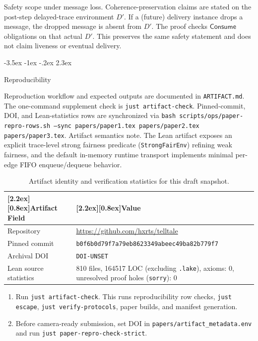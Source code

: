\documentclass[a4paper,10pt,twocolumn,english]{article}
\makeatletter
\renewcommand{\section}{\@startsection{section}{1}{\z@}%
  {-3.5ex \@plus -1ex \@minus -.2ex}%
  {2.3ex}%
  {\raggedright\normalfont\large\bfseries}}
\numberwithin{equation}{section}
\theoremstyle{paperdef}
\theoremstyle{paperplain}
\theoremstyle{paperdef}
\theoremstyle{paperremark}
\newcommand{\thead}[1]{\textbf{\raisebox{0pt}[2.2ex][0.8ex]{#1}}}
\newcommand{\Consume}{\ensuremath{\mathsf{Consume}}}
\makeatother
\begin{document}
Safety scope under message loss. Coherence-preservation claims are stated on the
post-step delayed-trace environment $D'$. If a (future) delivery instance drops a message,
the dropped message is absent from $D'$. The proof checks \Consume obligations on
that actual $D'$. This preserves the same safety statement and does not claim
liveness or eventual delivery.

\section{Reproducibility}
\label{app:reproducibility}

Reproduction workflow and expected outputs are documented in
\texttt{ARTIFACT.md}. The one-command supplement check is
\texttt{just artifact-check}. Pinned-commit, DOI, and Lean-statistics rows are
synchronized via
\texttt{bash scripts/ops/paper-repro-rows.sh --sync papers/paper1.tex papers/paper2.tex papers/paper3.tex}.
Artifact semantics note. The Lean artifact exposes an explicit trace-level
strong fairness predicate (\texttt{StrongFairEnv}) refining weak fairness, and
the default in-memory runtime transport implements minimal per-edge FIFO
enqueue/dequeue behavior.

\begin{table}[H]
	\centering
	\footnotesize
	\begin{tabularx}{\columnwidth}{@{}L{0.34\columnwidth}L{0.61\columnwidth}@{}}
		\toprule
		\thead{Artifact Field} & \thead{Value}                                                                             \\
		\midrule
		Repository             & \url{https://github.com/hxrts/telltale}                                                   \\
		Pinned commit & \texttt{b0f6b0d79f7a79eb}\allowbreak\texttt{8623349abeec49ba}\allowbreak\texttt{82b779f7} \\
		Archival DOI & \texttt{DOI-UNSET} \\
		Lean source statistics & 810 files, 164517 LOC (excluding \texttt{.lake}), axioms: 0, unresolved proof holes (\texttt{sorry}): 0 \\
		\bottomrule
	\end{tabularx}
	\caption{Artifact identity and verification statistics for this draft snapshot.}
\end{table}

\begin{enumerate}
	\item Run \texttt{just artifact-check}. This runs reproducibility row checks, \texttt{just escape}, \texttt{just verify-protocols}, paper builds, and manifest generation.
	\item Before camera-ready submission, set DOI in \texttt{papers/artifact\_metadata.env} and run \texttt{just paper-repro-check-strict}.
\end{enumerate}
\end{document}
